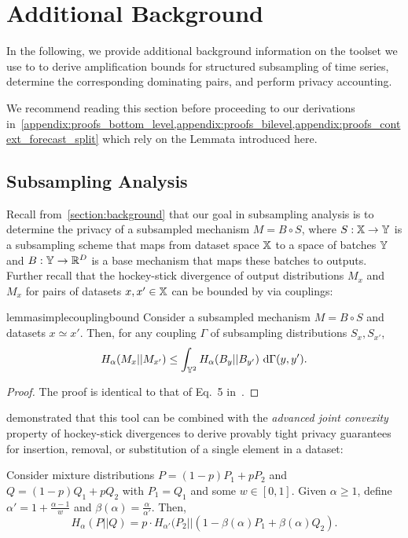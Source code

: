 \section{Additional Background}
In the following, we provide additional background information on the toolset we use to to derive amplification bounds for structured subsampling of time series, determine the corresponding dominating pairs, and perform privacy accounting.

We recommend reading this section before proceeding to our derivations in~\cref{appendix:proofs_bottom_level,appendix:proofs_bilevel,appendix:proofs_context_forecast_split} which rely on the Lemmata introduced here.
\subsection{Subsampling Analysis}\label{appendix:background_subsampling_analysis}
Recall from~\cref{section:background} that our goal in subsampling analysis is to determine the privacy of a subsampled mechanism $M = B \circ S$,
where $S : {\mathbb{X}} \rightarrow {\mathbb{Y}}$ is a subsampling scheme that maps from dataset space ${\mathbb{X}}$ to a space of batches ${\mathbb{Y}}$ and 
$B : {\mathbb{Y}} \rightarrow {\mathbb{R}}^D$ is a base mechanism that maps these batches to outputs.
Further recall that the hockey-stick divergence of output distributions $M_x$ and $M_x$ for pairs of datasets $x, x' \in {\mathbb{X}}$ can be bounded by via couplings:
\simplecoupling*
\begin{restatable}{lemma}{simplecouplingbound}\label{lemma:simple_coupling_bound}
    Consider a subsampled mechanism $M = B \circ S$ and datasets $x \simeq x'$. Then, for any coupling $\Gamma$ of subsampling distributions $S_x, S_{x'}$,
    \begin{equation*}
        H_\alpha(M_x || M_{x'})
        \leq
        \int_{{\mathbb{Y}}^2}
        H_\alpha(B_y || B_{y'}) \ \mathrm{d} \Gamma(y,y').
    \end{equation*}
\end{restatable}\begin{proof}
    The proof is identical to that of Eq.\ 5 in~\cite{balle2018privacy}.
\end{proof}
\citet{balle2018privacy} demonstrated that this tool can be combined with the \emph{advanced joint convexity} property of hockey-stick divergences to derive provably tight privacy guarantees for insertion, removal, or substitution of a single element in a dataset:
\begin{lemma}\label{lemma:advanced_joint_convexity}
    Consider mixture distributions $P = (1-p)  P_1 + p  P_2$ and $Q = (1-p)  Q_1 + p  Q_2$ with $P_1 = Q_1$ and some $w \in [0,1]$. Given $\alpha \geq 1$, define $\alpha' = 1 + \frac{\alpha - 1}{w}$ and $\beta(\alpha) = \frac{\alpha}{\alpha'}$.
    Then,
    \begin{equation*}
        H_\alpha(P || Q) = p \cdot H_{\alpha'}(P_2 || (1 - \beta(\alpha) P_1 + \beta(\alpha) Q_2).
    \end{equation*}
\end{lemma}
